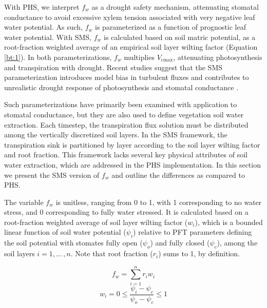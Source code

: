 \documentclass[draft,linenumbers]{agujournal}
\begin{document}
    With PHS, we interpret $f_w$ as a drought safety mechanism, attenuating stomatal conductance to avoid
    excessive xylem tension associated with very negative leaf water potential.
    As such, $f_w$ is parameterized as a function of prognostic leaf water potential.
    With SMS, $f_w$ is calculated based on soil matric potential, 
    as a root-fraction weighted average of an empirical soil layer wilting factor (Equation \ref{bt:1}).
    In both parameterizations, $f_w$ multiplies $V_{\text{cmax}}$, attenuating photosynthesis and transpiration with drought.
    Recent studies suggest that the SMS parameterization introduces model bias in turbulent fluxes \citep{bonan2014}
    and contributes to unrealistic drought response of photosynthesis and stomatal conductance \citep{powell2013}.

    
    Such parameterizations have primarily been examined with application to stomatal conductance, but they are also used to define vegetation soil water extraction. 
    Each timestep, the transpiration flux solution must be distributed among the vertically discretized soil layers.
    In the SMS framework, the transpiration sink is partitioned by layer according to the soil layer wilting factor and root fraction.
    This framework lacks several key physical attributes of soil water extraction, which are addressed in the PHS implementation.
    In this section we present the SMS version of $f_w$ and outline the differences as compared to PHS.
    
    The variable $f_w$ is unitless, ranging from 0 to 1, with 1 corresponding to no water stress, and 0 corresponding to fully water stressed. 
    It is calculated based on a root-fraction weighted average of soil layer wilting factor ($w_i$), which is a bounded linear 
    function of soil water potential ($\psi_i$) relative to PFT parameters defining the soil potential with stomates fully open ($
    \psi_{o}$) and fully closed ($\psi_{c}$), among the soil layers $i=1,...\,,n$. Note that root fraction ($r_i$) sums to 1, by definition.
    
    \begin{linenomath*}
    \begin{equation} f_w = \sum_{i=1}^{n}{r_iw_i}
    \label{bt:1}
    \end{equation}
    \begin{equation} 
    \label{bt:2}
    w_i=0 \leq \dfrac{\psi_i-\psi_{c}}{\psi_{o}-\psi_{c}} \leq 1
    \end{equation}
    \end{linenomath*}
    
\end{document}
